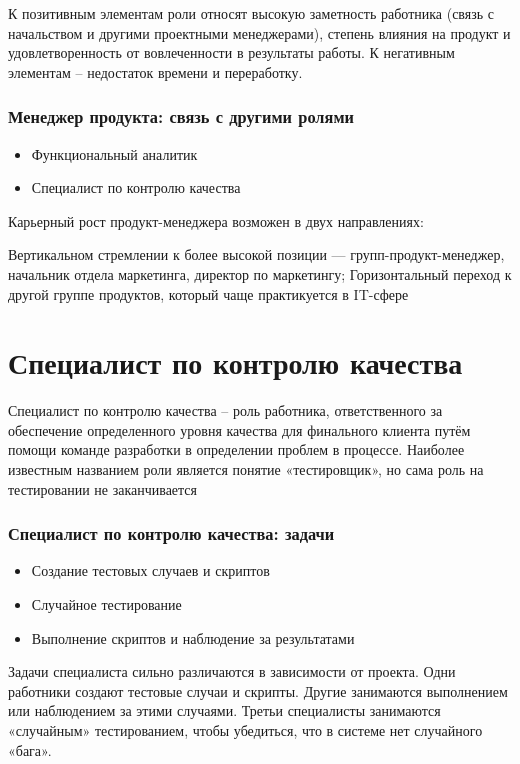 \documentclass{../industrial-development}
\begin{document}
\lecturenotes

К позитивным элементам роли относят высокую заметность работника (связь с начальством и другими проектными менеджерами), степень влияния на продукт и удовлетворенность от вовлеченности в результаты работы. 
К негативным элементам – недостаток времени и переработку. 
  ~\cite{Anatomy}

\begin{frame} \frametitle{Менеджер продукта: связь с другими ролями}
  \begin{itemize}
	\item Функциональный аналитик
	\item Специалист по контролю качества
	\end{itemize}
\end{frame}
\lecturenotes
Карьерный рост продукт-менеджера возможен в двух направлениях:

Вертикальном стремлении к более высокой позиции — групп-продукт-менеджер, начальник отдела маркетинга, директор по маркетингу;
Горизонтальный переход к другой группе продуктов, который чаще практикуется в IT-сфере

\section{Специалист по контролю качества }

\lecturenotes

Специалист по контролю качества – роль работника, ответственного за обеспечение определенного уровня качества для финального клиента путём помощи команде разработки в определении проблем в процессе. Наиболее известным названием роли является понятие «тестировщик», но сама роль на тестировании не заканчивается  ~\cite{Anatomy}

\begin{frame} \frametitle{Специалист по контролю качества: задачи}
  \begin{itemize}
	\item Создание тестовых случаев и скриптов
	\item Случайное тестирование
	\item Выполнение скриптов и наблюдение за результатами 
	\end{itemize}
\end{frame}

\lecturenotes

Задачи специалиста сильно различаются в зависимости от проекта. Одни работники создают тестовые случаи и скрипты. Другие занимаются выполнением или наблюдением за этими случаями. Третьи специалисты занимаются «случайным» тестированием, чтобы убедиться, что в системе нет случайного «бага».   ~\cite{Anatomy}
\end{document}
